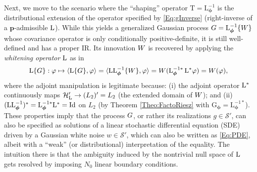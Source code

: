 \documentclass[11pt, english,english]{article}
\newcommand{\Lop}{{\rm L}}
\def\V#1{{\boldsymbol{#1}}}         %
\def\Spc#1{{\mathcal{#1}}}  %
\def\M#1{{\bf{#1}}}  %
\def\Op#1{{\mathrm{#1}}}  %
\def\Identity{\mathrm{Id}} %
\renewcommand{\[}{\begin{equation}}
\renewcommand{\]}[1]{\label{eq:#1}\end{equation}}
\def\gRand#1{{\uppercase{ #1}}}         %
\begin{document}
Next, we move to the scenario where the ``shaping'' operator $\Op T=\Op L^{-1}_{\V \phi}$ is the distributional extension of the operator specified by 
\eqref{Eq:gInverse} (right-inverse of a $\V p$-admissible
 $\Lop$). While this yields a generalized Gaussian process
 $\gRand G=\Op L^{-1}_{\V \phi}\{\gRand W\}$ whose covariance operator is only conditionally positive-definite, it is still well-defined and has a proper IR. Its innovation $\gRand W$ is recovered by applying the {\em whitening operator}
$\Lop$ as in
\begin{align}
\label{Eq:Innovationmodel0}
\Lop\{\gRand G\}: \varphi \mapsto \langle\Op \Lop\{\gRand G\},\varphi\rangle=
\langle\Op \Lop\Op L^{-1}_{\V \phi}\{\gRand W\},\varphi \rangle=\gRand W(\Op L^{{-1}\ast}_{\V \phi}\, \Lop^\ast\varphi)=W(\varphi),
\end{align}
where the adjoint manipulation is legitimate because: (i) the adjoint operator $\Lop^\ast$ continuously maps $\Spc H'_\Lop\to (L_2)'=L_2$ (the extended domain of $\gRand W$); and (ii)
$(\Lop\Op L^{-1}_{\V \phi} )^\ast=\Op L^{{-1}\ast}_{\V \phi}\Lop^\ast=\Identity$ on $L_2$ (by Theorem \ref{Theo:FactoRiesz} with $\Op G_\V \phi=\Op L^{{-1}\ast}_{\V \phi}$).
These properties imply that the process $\gRand g$, or rather its realizations $g \in \Spc S'$, can also be specified as 
solutions of a linear stochastic differential equation (SDE) driven by a Gaussian white noise $w \in \Spc S'$,
which can also be written as \eqref{Eq:PDE}, albeit with a ``weak'' (or distributional) interpretation of the equality.
The intuition there is that the ambiguity induced by the nontrivial null space of $\Lop$ gets resolved by imposing $N_0$ linear boundary conditions.
\end{document}
